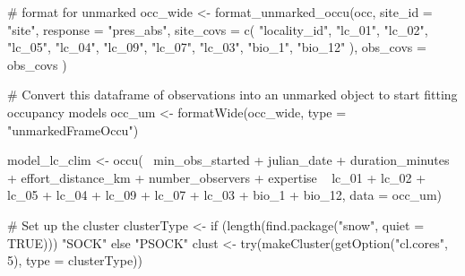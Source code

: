 \documentclass[
]{article}
\newenvironment{Shaded}{}{}
\newcommand{\CommentTok}[1]{\textcolor[rgb]{0.00,0.50,0.00}{#1}}
\newcommand{\ControlFlowTok}[1]{\textcolor[rgb]{0.00,0.00,1.00}{#1}}
\newcommand{\DataTypeTok}[1]{#1}
\newcommand{\DecValTok}[1]{#1}
\newcommand{\KeywordTok}[1]{\textcolor[rgb]{0.00,0.00,1.00}{#1}}
\newcommand{\NormalTok}[1]{#1}
\newcommand{\OperatorTok}[1]{#1}
\newcommand{\OtherTok}[1]{\textcolor[rgb]{1.00,0.25,0.00}{#1}}
\newcommand{\StringTok}[1]{\textcolor[rgb]{0.00,0.50,0.50}{#1}}
\begin{document}
\begin{Shaded}
\begin{Highlighting}[]
{  \CommentTok{# format for unmarked}
\NormalTok{  occ_wide <-}\StringTok{ }\KeywordTok{format_unmarked_occu}\NormalTok{(occ,}
    \DataTypeTok{site_id =} \StringTok{"site"}\NormalTok{,}
    \DataTypeTok{response =} \StringTok{"pres_abs"}\NormalTok{,}
    \DataTypeTok{site_covs =} \KeywordTok{c}\NormalTok{(}
      \StringTok{"locality_id"}\NormalTok{, }\StringTok{"lc_01"}\NormalTok{, }\StringTok{"lc_02"}\NormalTok{, }\StringTok{"lc_05"}\NormalTok{,}
      \StringTok{"lc_04"}\NormalTok{, }\StringTok{"lc_09"}\NormalTok{, }\StringTok{"lc_07"}\NormalTok{, }\StringTok{"lc_03"}\NormalTok{, }\StringTok{"bio_1"}\NormalTok{, }\StringTok{"bio_12"}
\NormalTok{    ),}
    \DataTypeTok{obs_covs =}\NormalTok{ obs_covs}
\NormalTok{  )}

  \CommentTok{# Convert this dataframe of observations into an unmarked object to start fitting occupancy models}
\NormalTok{  occ_um <-}\StringTok{ }\KeywordTok{formatWide}\NormalTok{(occ_wide, }\DataTypeTok{type =} \StringTok{"unmarkedFrameOccu"}\NormalTok{)}

\NormalTok{  model_lc_clim <-}\StringTok{ }\KeywordTok{occu}\NormalTok{(}\OperatorTok{~}\StringTok{ }\NormalTok{min_obs_started }\OperatorTok{+}
\StringTok{    }\NormalTok{julian_date }\OperatorTok{+}
\StringTok{    }\NormalTok{duration_minutes }\OperatorTok{+}
\StringTok{    }\NormalTok{effort_distance_km }\OperatorTok{+}
\StringTok{    }\NormalTok{number_observers }\OperatorTok{+}
\StringTok{    }\NormalTok{expertise }\OperatorTok{~}\StringTok{ }\NormalTok{lc_}\DecValTok{01} \OperatorTok{+}\StringTok{ }\NormalTok{lc_}\DecValTok{02} \OperatorTok{+}\StringTok{ }\NormalTok{lc_}\DecValTok{05} \OperatorTok{+}\StringTok{ }\NormalTok{lc_}\DecValTok{04} \OperatorTok{+}\StringTok{ }\NormalTok{lc_}\DecValTok{09} \OperatorTok{+}\StringTok{ }\NormalTok{lc_}\DecValTok{07} \OperatorTok{+}\StringTok{ }\NormalTok{lc_}\DecValTok{03} \OperatorTok{+}\StringTok{ }
\StringTok{      }\NormalTok{bio_}\DecValTok{1} \OperatorTok{+}\StringTok{ }\NormalTok{bio_}\DecValTok{12}\NormalTok{, }\DataTypeTok{data =}\NormalTok{ occ_um)}

  \CommentTok{# Set up the cluster}
\NormalTok{  clusterType <-}\StringTok{ }\ControlFlowTok{if}\NormalTok{ (}\KeywordTok{length}\NormalTok{(}\KeywordTok{find.package}\NormalTok{(}\StringTok{"snow"}\NormalTok{, }\DataTypeTok{quiet =} \OtherTok{TRUE}\NormalTok{))) }\StringTok{"SOCK"} \ControlFlowTok{else} \StringTok{"PSOCK"}
\NormalTok{  clust <-}\StringTok{ }\KeywordTok{try}\NormalTok{(}\KeywordTok{makeCluster}\NormalTok{(}\KeywordTok{getOption}\NormalTok{(}\StringTok{"cl.cores"}\NormalTok{, }\DecValTok{5}\NormalTok{), }\DataTypeTok{type =}\NormalTok{ clusterType))}

}
\end{Highlighting}
\end{Shaded}
\end{document}
